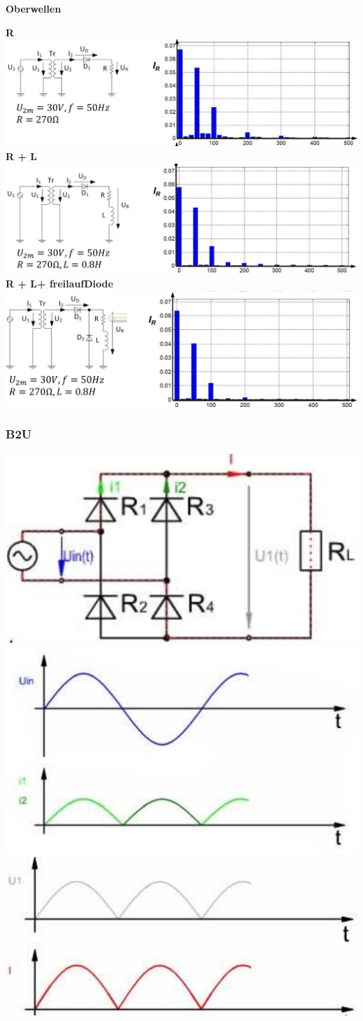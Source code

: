 %
\textbf{Oberwellen}\newline
\vspace{-1cm}
\begin{multicols}{3}
    \textbf{ \qquad R}\newline   
    \includegraphics[width=\linewidth]{images/M1UR}   
    \textbf{\null \qquad R + L}\newline
    \includegraphics[width=\linewidth]{images/M1URL}
    \textbf{ \qquad R + L+ freilaufDiode}\newline
    \includegraphics[width=\linewidth]{images/M1URLD}
\end{multicols}
\clearpage

\subsubsection{B2U}
\includegraphics[width=0.4\linewidth]{images/PrakUGB2}
\includegraphics[width=0.3\linewidth]{images/PrakUGB2Kl1}
\includegraphics[width=0.3\linewidth]{images/PrakUGB2Kl2}\newline

\clearpage